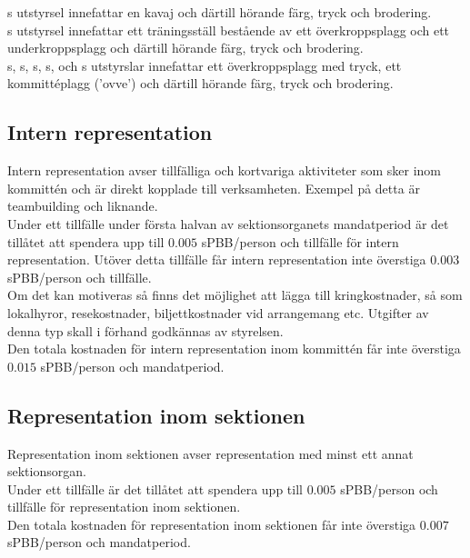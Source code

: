 \documentclass[11pt, includeaddress]{classes/cthit}
\begin{document}
\ARMIT{}s utstyrsel innefattar en kavaj och därtill hörande färg, tryck och brodering. \\

\FRITID{}s utstyrsel innefattar ett träningsställ bestående av ett överkroppsplagg och ett underkroppsplagg och därtill hörande färg, tryck och brodering. \\

\FLASHIT{}s, \NOLLKIT{}s, \PRIT{}s, \SEXIT{}s, \CLOUDLORDS{} och \MRCIT{}s utstyrslar innefattar ett överkroppsplagg med tryck, ett kommittéplagg (’ovve’) och därtill hörande färg, tryck och brodering.

\subsection{Intern representation}
Intern representation avser tillfälliga och kortvariga aktiviteter som sker inom kommittén och är direkt kopplade till verksamheten. Exempel på detta är teambuilding och liknande. \\

Under ett tillfälle under första halvan av sektionsorganets mandatperiod är det tillåtet att spendera upp till $0.005$ sPBB/person och tillfälle för intern representation. Utöver detta tillfälle får intern representation inte överstiga $0.003$ sPBB/person och tillfälle. \\

Om det kan motiveras så finns det möjlighet att lägga till kringkostnader, så som lokalhyror, resekostnader, biljettkostnader vid arrangemang etc. Utgifter av denna typ skall i förhand godkännas av styrelsen. \\

Den totala kostnaden för intern representation inom kommittén får inte överstiga $0.015$ sPBB/person och mandatperiod. 

\subsection{Representation inom sektionen}
Representation inom sektionen avser representation med minst ett annat sektionsorgan. \\

Under ett tillfälle är det tillåtet att spendera upp till $0.005$ sPBB/person och tillfälle för representation inom sektionen. \\

Den totala kostnaden för representation inom sektionen får inte överstiga $0.007$ sPBB/person och mandatperiod.
\end{document}
